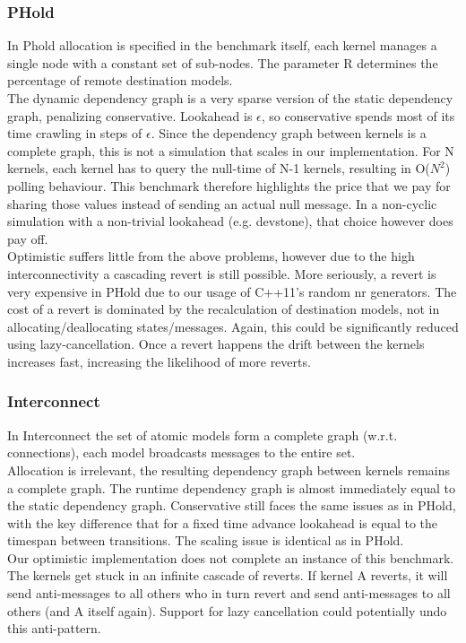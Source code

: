 \subsubsection{PHold}
In Phold \cite{PHOLD} allocation is specified in the benchmark itself, each kernel manages a single node with a constant set of sub-nodes. The parameter R determines the percentage of remote destination models.\\
The dynamic dependency graph is a very sparse version of the static dependency graph, penalizing conservative. Lookahead is $\epsilon$, so conservative spends most of its time crawling in steps of $\epsilon$. Since the dependency graph between kernels is a complete graph, this is not a simulation that scales in our implementation. For N kernels, each kernel has to query the null-time of N-1 kernels, resulting in O($N^2$) polling behaviour. This benchmark therefore highlights the price that we pay for sharing those values instead of sending an actual null message. In a non-cyclic simulation with a non-trivial lookahead (e.g. devstone), that choice however does pay off.\\
Optimistic suffers little from the above problems, however due to the high interconnectivity a cascading revert is still possible. More seriously, a revert is very expensive in PHold due to our usage of C++11's random nr generators. The cost of a revert is dominated by the recalculation of destination models, not in allocating/deallocating states/messages. Again, this could be significantly reduced using lazy-cancellation. Once a revert happens the drift between the kernels increases fast, increasing the likelihood of more reverts. 

\subsubsection{Interconnect}
In Interconnect
the set of atomic models form a complete graph (w.r.t. connections), each model broadcasts messages to the entire set. \\
Allocation is irrelevant, the resulting dependency graph between kernels remains  a complete graph. The runtime dependency graph is almost immediately equal to the static dependency graph.
Conservative still faces the same issues as in PHold, with the key difference that for a fixed time advance lookahead is equal to the timespan between transitions. The scaling issue is identical as in PHold.\\
Our optimistic implementation does not complete an instance of this benchmark. The kernels get stuck in an infinite cascade of reverts. If kernel A reverts, it will send anti-messages to all others who in turn revert and send anti-messages to all others (and A itself again). Support for lazy cancellation could potentially undo this anti-pattern.
